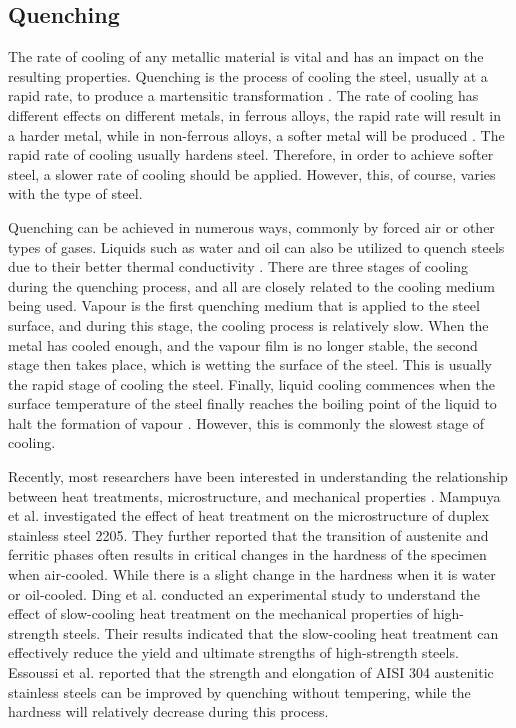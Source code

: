 \subsection{Quenching}  
The rate of cooling of any metallic material is vital and has an impact on the resulting properties. Quenching is the process of cooling the steel, usually at a rapid rate, to produce a martensitic transformation \cite{singh2020applied}. The rate of cooling has different effects on different metals, in ferrous alloys, the rapid rate will result in a harder metal, while in non-ferrous alloys, a softer metal will be produced \cite{mampuya2021effect}. The rapid rate of cooling usually hardens steel. Therefore, in order to achieve softer steel, a slower rate of cooling should be applied. However, this, of course, varies with the type of steel. 

Quenching can be achieved in numerous ways, commonly by forced air or other types of gases. Liquids such as water and oil can also be utilized to quench steels due to their better thermal conductivity \cite{singh2020applied}. There are three stages of cooling during the quenching process, and all are closely related to the cooling medium being used. Vapour is the first quenching medium that is applied to the steel surface, and during this stage, the cooling process is relatively slow. When the metal has cooled enough, and the vapour film is no longer stable, the second stage then takes place, which is wetting the surface of the steel. This is usually the rapid stage of cooling the steel. Finally, liquid cooling commences when the surface temperature of the steel finally reaches the boiling point of the liquid to halt the formation of vapour \cite{marzorati2018green, protopopoff2011surface}. However, this is commonly the slowest stage of cooling.

Recently, most researchers have been interested in understanding the relationship between heat treatments, microstructure, and mechanical properties \cite{marzorati2018green, whitman1924effect, cai2018influence}. Mampuya et al. \cite{mampuya2021effect} investigated the effect of heat treatment on the microstructure of duplex stainless steel 2205. They further reported that the transition of austenite and ferritic phases often results in critical changes in the hardness of the specimen when air-cooled. While there is a slight change in the hardness when it is water or oil-cooled. Ding et al. \cite{zhang2021influence} conducted an experimental study to understand the effect of slow-cooling heat treatment on the mechanical properties of high-strength steels. Their results indicated that the slow-cooling heat treatment can effectively reduce the yield and ultimate strengths of high-strength steels. Essoussi et al. \cite{essoussi2019heat} reported that the strength and elongation of AISI 304 austenitic stainless steels can be improved by quenching without tempering, while the hardness will relatively decrease during this process.

